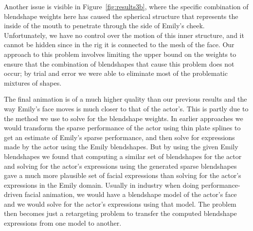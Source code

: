 Another issue is visible in Figure~\ref{fig:results3b}, where the specific combination of blendshape weights here has caused the spherical structure that represents the inside of the mouth to penetrate through the side of Emily's cheek. Unfortunately, we have no control over the motion of this inner structure, and it cannot be hidden since in the \Maya rig it is connected to the mesh of the face. Our approach to this problem involves limiting the upper bound on the weights to ensure that the combination of blendshapes that cause this problem does not occur; by trial and error we were able to eliminate most of the problematic mixtures of shapes.

The final animation is of a much higher quality than our previous results and the way Emily's face moves is much closer to that of the actor's. This is partly due to the method we use to solve for the blendshape weights. In earlier approaches we would transform the sparse performance of the actor using thin plate splines to get an estimate of Emily's sparse performance, and then solve for expressions made by the actor using the Emily blendshapes. But by using the given Emily blendshapes we found that computing a similar set of blendshapes for the actor and solving for the actor's expressions using the generated sparse blendshapes gave a much more plausible set of facial expressions than solving for the actor's expressions in the Emily domain. Usually in industry when doing performance-driven facial animation, we would have a blendshape model of the actor's face and we would solve for the actor's expressions using that model. The problem then becomes just a retargeting problem to transfer the computed blendshape expressions from one model to another. 

